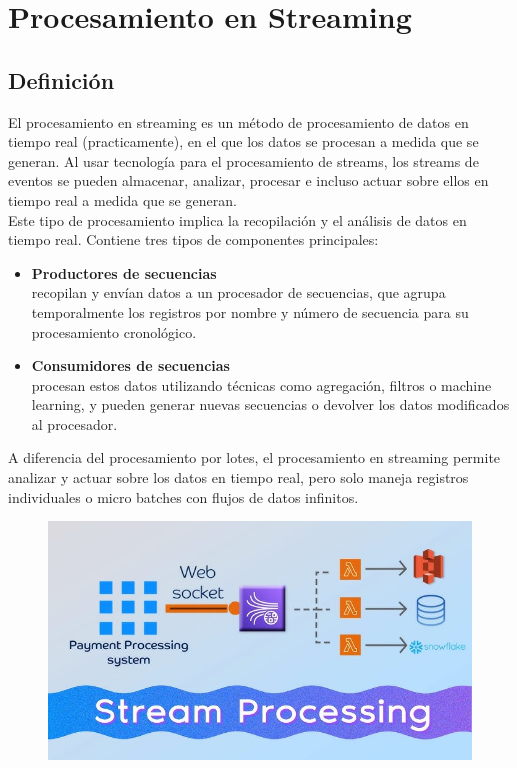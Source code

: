 \documentclass[12pt]{article}
\begin{document}
\section{Procesamiento en Streaming}

\subsection{Definición}

El procesamiento en streaming es un método de procesamiento de datos en tiempo real (practicamente), en el que los datos se procesan a medida que 
se generan. Al usar tecnología para el procesamiento de streams, los streams de eventos se pueden almacenar, analizar, procesar e incluso actuar 
sobre ellos en tiempo real a medida que se generan.
\\
Este tipo de procesamiento implica la recopilación y el análisis de datos en tiempo real. Contiene tres tipos de componentes principales:

\begin{itemize}
    \item \textbf{Productores de secuencias}\\
    recopilan y envían datos a un procesador de secuencias, que agrupa temporalmente los registros por nombre y número de secuencia 
    para su procesamiento cronológico.
    \item \textbf{Consumidores de secuencias}\\
    procesan estos datos utilizando técnicas como agregación, filtros o machine learning, y pueden generar nuevas secuencias o devolver 
    los datos modificados al procesador.
\end{itemize}

A diferencia del procesamiento por lotes, el procesamiento en streaming permite analizar y actuar sobre los datos en tiempo real, pero solo
maneja registros individuales o micro batches con flujos de datos infinitos. 

\begin{figure}[h!]
    \centering
    \includegraphics[width=.6\textwidth]{Streaming.jpg}
    \label{fig:my_label}
\end{figure}
\end{document}
